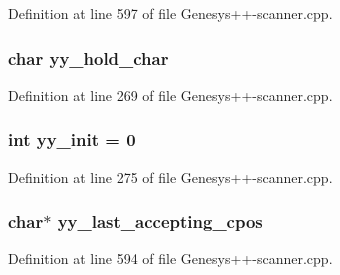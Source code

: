 Definition at line 597 of file Genesys++-\/scanner.\-cpp.

\hypertarget{_genesys_09_09-scanner_8cpp_a13f78e763996d2d86c85b45cbe146282}{
\subsubsection[{yy\-\_\-hold\-\_\-char}]{\setlength{\rightskip}{0pt plus 5cm}char yy\-\_\-hold\-\_\-char\hspace{0.3cm}{\ttfamily [static]}}}\label{_genesys_09_09-scanner_8cpp_a13f78e763996d2d86c85b45cbe146282}


Definition at line 269 of file Genesys++-\/scanner.\-cpp.

\hypertarget{_genesys_09_09-scanner_8cpp_aeae6dabf9dcc4769518ecf054181b1c8}{
\subsubsection[{yy\-\_\-init}]{\setlength{\rightskip}{0pt plus 5cm}int yy\-\_\-init = 0\hspace{0.3cm}{\ttfamily [static]}}}\label{_genesys_09_09-scanner_8cpp_aeae6dabf9dcc4769518ecf054181b1c8}


Definition at line 275 of file Genesys++-\/scanner.\-cpp.

\hypertarget{_genesys_09_09-scanner_8cpp_afc6bef71feb2394eb5291e710139dfb3}{
\subsubsection[{yy\-\_\-last\-\_\-accepting\-\_\-cpos}]{\setlength{\rightskip}{0pt plus 5cm}char$\ast$ yy\-\_\-last\-\_\-accepting\-\_\-cpos\hspace{0.3cm}{\ttfamily [static]}}}\label{_genesys_09_09-scanner_8cpp_afc6bef71feb2394eb5291e710139dfb3}


Definition at line 594 of file Genesys++-\/scanner.\-cpp.


